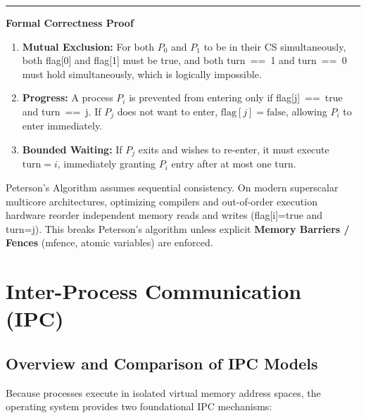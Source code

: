 \documentclass[11pt,a4paper]{article}
\newcommand{\ic}[1]{\mbox{\colorbox{AnthCodeBG}{\footnotesize\ttfamily\textcolor{AnthBlue}{#1}}}}
\newcommand{\concept}[1]{%
  \noindent\textcolor{AnthGreen}{\rule{3pt}{10pt}}\enspace
  \textbf{\color{AnthDark}#1}\par\vspace{2pt}%
}
\newenvironment{Warn}[1][Important Pitfall / Warning]{\begin{tcolorbox}[warnbox, title={#1}]}{\end{tcolorbox}}
\begin{document}
\concept{Formal Correctness Proof}
\begin{enumerate}
    \item \textbf{Mutual Exclusion:} For both $P_0$ and $P_1$ to be in their CS simultaneously, both \ic{flag[0]} and \ic{flag[1]} must be \ic{true}, and both \ic{turn == 1} and \ic{turn == 0} must hold simultaneously, which is logically impossible.
    \item \textbf{Progress:} A process $P_i$ is prevented from entering only if \ic{flag[j] == true} and \ic{turn == j}. If $P_j$ does not want to enter, $\text{flag}[j] = \text{false}$, allowing $P_i$ to enter immediately.
    \item \textbf{Bounded Waiting:} If $P_j$ exits and wishes to re-enter, it must execute $\text{turn} = i$, immediately granting $P_i$ entry after at most one turn.
\end{enumerate}

\begin{Warn}[Modern Hardware Limitations of Peterson's Algorithm]
Peterson's Algorithm assumes sequential consistency. On modern superscalar multicore architectures, optimizing compilers and out-of-order execution hardware reorder independent memory reads and writes (\ic{flag[i]=true} and \ic{turn=j}). This breaks Peterson's algorithm unless explicit \textbf{Memory Barriers / Fences} (\ic{mfence}, atomic variables) are enforced.
\end{Warn}

\section{Inter-Process Communication (IPC)}

\subsection{Overview and Comparison of IPC Models}

Because processes execute in isolated virtual memory address spaces, the operating system provides two foundational IPC mechanisms:
\end{document}
